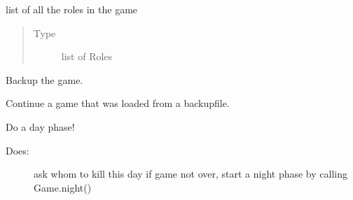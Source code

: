 \documentclass[letterpaper,10pt,english]{sphinxmanual}
\begin{document}
\begin{fulllineitems}
\begin{fulllineitems}
\label{\detokenize{chatwolf:chatwolf.game.Game.roles}}
list of all the roles in the game
\begin{quote}\begin{description}
\item[{Type}] \leavevmode
list of Roles

\end{description}\end{quote}

\end{fulllineitems}


\begin{fulllineitems}
\label{\detokenize{chatwolf:chatwolf.game.Game.bkp}}
Backup the game.

\end{fulllineitems}


\begin{fulllineitems}
\label{\detokenize{chatwolf:chatwolf.game.Game.continue_bkp}}
Continue a game that was loaded from a backup\sphinxhyphen{}file.

\end{fulllineitems}


\begin{fulllineitems}
\label{\detokenize{chatwolf:chatwolf.game.Game.day}}
Do a day phase!
\begin{description}
\item[{Does:}] \leavevmode
ask whom to kill this day
if game not over, start a night phase by calling Game.night()

\end{description}

\end{fulllineitems}



\end{fulllineitems}
\end{document}
